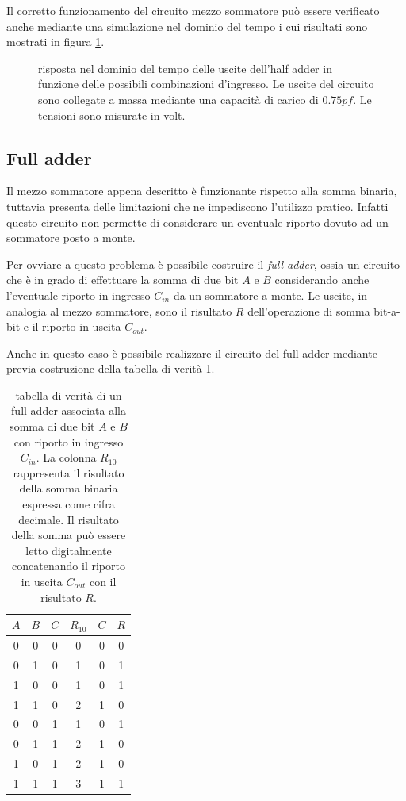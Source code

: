 	Il corretto funzionamento del circuito mezzo sommatore può essere verificato anche mediante una simulazione nel dominio del tempo i cui risultati sono mostrati in figura \ref{fig:ha:sim}.	
	\begin{figure}[bht]
		\centering
		
		\caption{risposta nel dominio del tempo delle uscite dell'half adder in funzione delle possibili combinazioni d'ingresso. Le uscite del circuito sono collegate a massa mediante una capacità di carico di $0.75pf$. Le tensioni sono misurate in volt.}
		\label{fig:ha:sim}
	\end{figure}

\subsection*{Full adder}
	Il mezzo sommatore appena descritto è funzionante rispetto alla somma binaria, tuttavia presenta delle limitazioni che ne impediscono l'utilizzo pratico. Infatti questo circuito non permette di considerare un eventuale riporto dovuto ad un sommatore posto a monte.
	
	Per ovviare a questo problema è possibile costruire il \textit{full adder}, ossia un circuito che è in grado di effettuare la somma di due bit $A$ e $B$ considerando anche l'eventuale riporto in ingresso $C_{in}$ da un sommatore a monte. Le uscite, in analogia al mezzo sommatore, sono il risultato $R$ dell'operazione di somma bit-a-bit e il riporto in uscita $C_{out}$.
	
	Anche in questo caso è possibile realizzare il circuito del full adder mediante previa costruzione della tabella di verità \ref{tab:fa:tabella}.
	
	
	\begin{table}[bht]
		\centering
		\begin{tabular}{c c c | c | c c }
			$A$ & $B$ & $C$ & $R_{10}$ & $C$ & $R$ \\ \hline
			0 & 0 & 0 & 0 & 0 & 0 \\	
			0 & 1 & 0 & 1 & 0 & 1 \\	
			1 & 0 & 0 & 1 & 0 & 1 \\
			1 & 1 & 0 & 2 & 1 & 0 \\
			0 & 0 & 1 & 1 & 0 & 1 \\	
			0 & 1 & 1 & 2 & 1 & 0 \\	
			1 & 0 & 1 & 2 & 1 & 0 \\
			1 & 1 & 1 & 3 & 1 & 1 \\				
		\end{tabular}
		\caption{tabella di verità di un full adder associata alla somma di due bit $A$ e $B$ con riporto in ingresso $C_{in}$. La colonna $R_{10}$ rappresenta il risultato della somma binaria espressa come cifra decimale. Il risultato della somma può essere letto digitalmente concatenando il riporto in uscita $C_{out}$ con il risultato $R$.}
		\label{tab:fa:tabella}
	\end{table}
	
